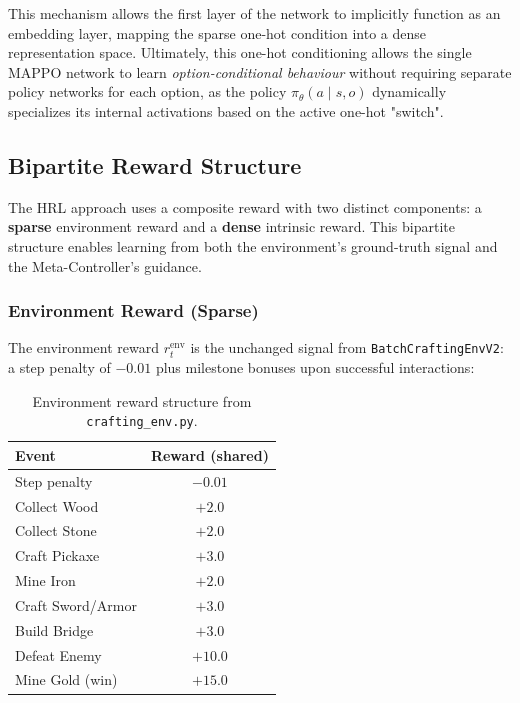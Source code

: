 This mechanism allows the first layer of the network to implicitly function as an embedding layer, mapping the sparse one-hot condition into a dense representation space. Ultimately, this one-hot conditioning allows the single MAPPO network to learn \emph{option-conditional behaviour} without requiring separate policy networks for each option, as the policy $\pi_\theta(a \mid s, o)$ dynamically specializes its internal activations based on the active one-hot "switch".

\subsection{Bipartite Reward Structure}
\label{sec:bipartite_reward}

The HRL approach uses a composite reward with two distinct components:
a \textbf{sparse} environment reward and a \textbf{dense} intrinsic
reward. This bipartite structure enables learning from both the
environment's ground-truth signal and the Meta-Controller's guidance.

\subsubsection{Environment Reward (Sparse)}
The environment reward $r_t^{\text{env}}$ is the unchanged signal from
\texttt{BatchCraftingEnvV2}: a step penalty of $-0.01$ plus milestone
bonuses upon successful interactions:

\begin{table}[H]
\centering
\caption{Environment reward structure from \texttt{crafting\_env.py}.}
\label{tab:env_rewards}
\begin{tabular}{@{}lc@{}}
\toprule
\textbf{Event} & \textbf{Reward (shared)} \\
\midrule
Step penalty      & $-0.01$ \\
Collect Wood      & $+2.0$  \\
Collect Stone     & $+2.0$  \\
Craft Pickaxe     & $+3.0$  \\
Mine Iron         & $+2.0$  \\
Craft Sword/Armor & $+3.0$  \\
Build Bridge      & $+3.0$  \\
Defeat Enemy      & $+10.0$ \\
Mine Gold (win)   & $+15.0$ \\
\bottomrule
\end{tabular}
\end{table}

